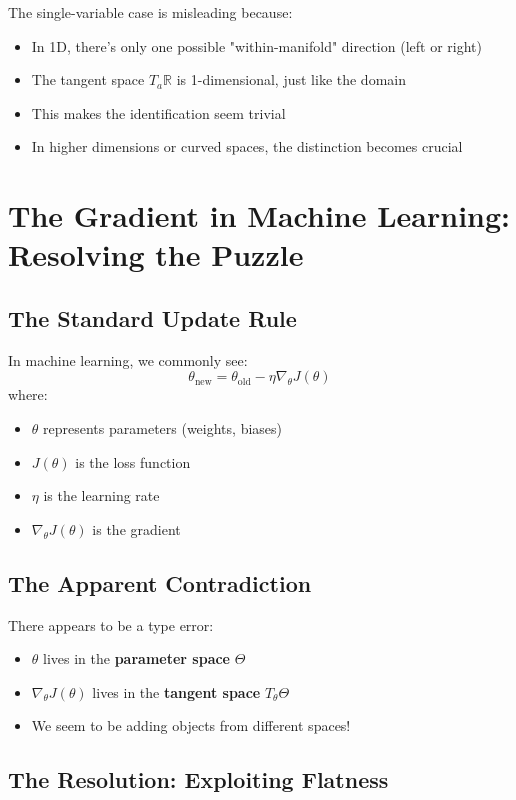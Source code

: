 \begin{notechapter}
The single-variable case is misleading because:

\begin{itemize}
\item In 1D, there's only one possible "within-manifold" direction (left or right)
\item The tangent space $T_a\mathbb{R}$ is 1-dimensional, just like the domain
\item This makes the identification seem trivial
\item In higher dimensions or curved spaces, the distinction becomes crucial
\end{itemize}


\section{The Gradient in Machine Learning: Resolving the Puzzle}

\subsection{The Standard Update Rule}

In machine learning, we commonly see:
\[
\theta_{\text{new}} = \theta_{\text{old}} - \eta \nabla_\theta J(\theta)
\]
where:
\begin{itemize}
\item $\theta$ represents parameters (weights, biases)
\item $J(\theta)$ is the loss function  
\item $\eta$ is the learning rate
\item $\nabla_\theta J(\theta)$ is the gradient
\end{itemize}

\subsection{The Apparent Contradiction}

There appears to be a type error:
\begin{itemize}
\item $\theta$ lives in the \textbf{parameter space} $\Theta$
\item $\nabla_\theta J(\theta)$ lives in the \textbf{tangent space} $T_\theta\Theta$
\item We seem to be adding objects from different spaces!
\end{itemize}

\subsection{The Resolution: Exploiting Flatness}


\end{notechapter}
